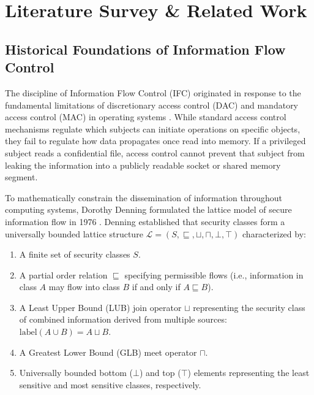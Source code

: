 \chapter{Literature Survey \& Related Work}
\label{chap:literature}

\section{Historical Foundations of Information Flow Control}
The discipline of Information Flow Control (IFC) originated in response to the fundamental limitations of discretionary access control (DAC) and mandatory access control (MAC) in operating systems \cite{saltzer1975protection}. While standard access control mechanisms regulate which subjects can initiate operations on specific objects, they fail to regulate how data propagates once read into memory. If a privileged subject reads a confidential file, access control cannot prevent that subject from leaking the information into a publicly readable socket or shared memory segment.

To mathematically constrain the dissemination of information throughout computing systems, Dorothy Denning formulated the lattice model of secure information flow in 1976 \cite{denning1976lattice}. Denning established that security classes form a universally bounded lattice structure $\mathcal{L} = (S, \sqsubseteq, \sqcup, \sqcap, \bot, \top)$ characterized by:
\begin{enumerate}
    \item A finite set of security classes $S$.
    \item A partial order relation $\sqsubseteq$ specifying permissible flows (i.e., information in class $A$ may flow into class $B$ if and only if $A \sqsubseteq B$).
    \item A Least Upper Bound (LUB) join operator $\sqcup$ representing the security class of combined information derived from multiple sources: $\text{label}(A \cup B) = A \sqcup B$.
    \item A Greatest Lower Bound (GLB) meet operator $\sqcap$.
    \item Universally bounded bottom ($\bot$) and top ($\top$) elements representing the least sensitive and most sensitive classes, respectively.
\end{enumerate}

